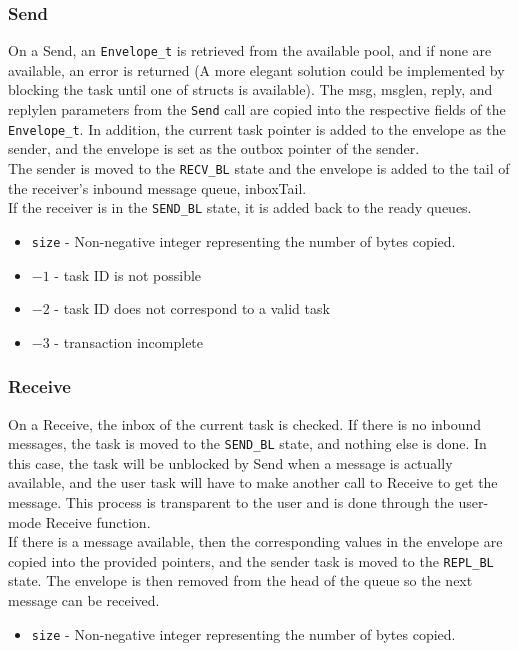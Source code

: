 \documentclass[12pt]{article}
\begin{document}
\subsubsection{Send}
On a Send, an \texttt{Envelope\_t} is retrieved from the available pool, and if none are available, an error is returned (A more elegant solution could be implemented by blocking the task until one of structs is available). The msg, msglen, reply, and replylen parameters from the \texttt{Send} call are copied into the respective fields of the \texttt{Envelope\_t}. In addition, the current task pointer is added to the envelope as the sender, and the envelope is set as the outbox pointer of the sender.
\\
The sender is moved to the \texttt{RECV\_BL} state and the envelope is added to the tail of the receiver's inbound message queue, inboxTail.
\\
If the receiver is in the \texttt{SEND\_BL} state, it is added back to the ready queues.
\begin{itemize}
  \item \texttt{size} - Non-negative integer representing the number of bytes copied.
  \item $-1$ - task ID is not possible
  \item $-2$ - task ID does not correspond to a valid task
  \item $-3$ - transaction incomplete
    \\
\end{itemize}
\subsubsection{Receive}
On a Receive, the inbox of the current task is checked. If there is no inbound messages, the task is moved to the \texttt{SEND\_BL} state, and nothing else is done. In this case, the task will be unblocked by Send when a message is actually available, and the user task will have to make another call to Receive to get the message. This process is transparent to the user and is done through the user-mode Receive function.
\\
If there is a message available, then the corresponding values in the envelope are copied into the provided pointers, and the sender task is moved to the \texttt{REPL\_BL} state. The envelope is then removed from the head of the queue so the next message can be received.
\begin{itemize}
  \item \texttt{size} - Non-negative integer representing the number of bytes copied.
    \\
\end{itemize}
\end{document}
